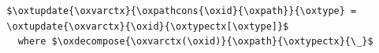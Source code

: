 \begin{lstlisting}
  $\oxtupdate{\oxvarctx}{\oxpathcons{\oxid}{\oxpath}}{\oxtype} =
  \oxtupdate{\oxvarctx}{\oxid}{\oxtypectx[\oxtype]}$
    where $\oxdecompose{\oxvarctx(\oxid)}{\oxpath}{\oxtypectx}{\_}$
\end{lstlisting}